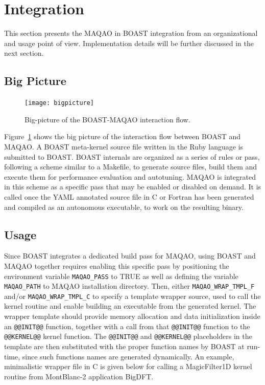 \documentclass[11pt, a4paper, twoside]{montblanc2}
\begin{document}
\section{Integration}

This section presents the MAQAO in BOAST integration from an organizational and usage point of view. 
Implementation details will be further discussed in the next section.

\subsection{Big Picture}
\begin{figure}[h]
  \centering
\texttt{[image: bigpicture]}
\caption{Big-picture of the BOAST-MAQAO interaction flow.}\label{fig:bigpict}
\end{figure}

Figure~\ref{fig:bigpict} shows the big picture of the interaction flow between BOAST and MAQAO. A 
BOAST meta-kernel source file written in the Ruby language is submitted to BOAST. BOAST internals 
are organized as a series of rules or pass, following a scheme similar to a Makefile, to generate 
source files, build them and execute them for performance evaluation and autotuning. MAQAO is 
integrated in this scheme as a specific pass that may be enabled or disabled on demand. It is called 
once the YAML annotated source file in C or Fortran has been generated and compiled as an autonomous 
executable, to work on the resulting binary.

\subsection{Usage}

Since BOAST integrates a dedicated build pass for MAQAO, using BOAST and MAQAO together requires 
enabling this specific pass by positioning the environment variable \verb|MAQAO_PASS| to TRUE as 
well as defining the variable \verb|MAQAO_PATH| to MAQAO installation directory. Then, either 
\verb|MAQAO_WRAP_TMPL_F| and/or \verb|MAQAO_WRAP_TMPL_C| to specify a template wrapper source, used 
to call the kernel routine and enable building an executable from the generated kernel. The wrapper 
template should provide memory allocation and data initialization inside an \verb|@@INIT@@| 
function, together with a call from that \verb|@@INIT@@| function to the \verb|@@KERNEL@@| kernel 
function. The \verb|@@INIT@@| and \verb|@@KERNEL@@| placeholders in the template are then 
substituted with the proper function names by BOAST at run-time, since such functions names are 
generated dynamically. An example, minimalistic wrapper file in C is given below for calling a 
MagicFilter1D kernel routine from MontBlanc-2 application BigDFT.
\end{document}
